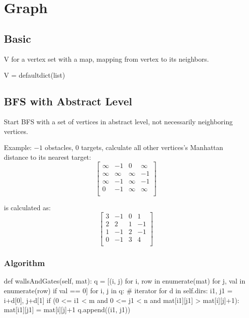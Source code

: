 \chapter{Graph}

\section{Basic}
 V for a vertex set with a map, mapping from vertex to its neighbors.
\begin{python}
V = defaultdict(list)
\end{python}
\section{BFS with Abstract Level}
Start BFS with a set of vertices in abstract level, not necessarily neighboring vertices.

Example:
$-1$ obstacles, $0$ targets, calculate all other vertices's Manhattan distance to its nearest target:
$$
\begin{bmatrix}
\infty & -1 & 0 & \infty \\
\infty & \infty & \infty & -1 \\
\infty & -1 & \infty & -1 \\
0 & -1 & \infty & \infty \\
\end{bmatrix} 
$$

is calculated as:
$$
\begin{bmatrix}
3 & -1 & 0 & 1 \\
2 & 2 & 1 & -1 \\
1 & -1 & 2 & -1 \\
0 & -1 & 3 & 4 \\
\end{bmatrix}
$$

\subsection{Algorithm}
\begin{python}
def wallsAndGates(self, mat):
    q = [(i, j) for i, row in enumerate(mat) 
         for j, val in enumerate(row) if val == 0]
    for i, j in q:  # iterator
        for d in self.dirs:
            i1, j1 = i+d[0], j+d[1]
            if (0 <= i1 < m and  0 <= j1 < n and 
                mat[i1][j1] > mat[i][j]+1):
                mat[i1][j1] = mat[i][j]+1
                q.append((i1, j1))
\end{python}



